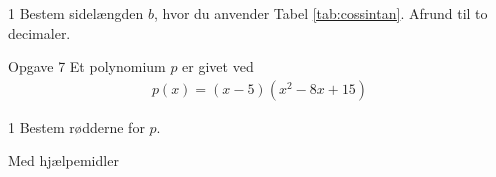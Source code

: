 \begin{delopgave}{1}
	Bestem sidelængden $b$, hvor du anvender Tabel \ref{tab:cossintan}. Afrund til to decimaler.
\end{delopgave}
%
%
%
%
%
\begin{opgavetekst}{Opgave 7}
	Et polynomium $p$ er givet ved
	\begin{align*}
		p(x) = (x-5)(x^2-8x+15)
	\end{align*}
\end{opgavetekst}
\begin{delopgave}{1}
	Bestem rødderne for $p$. 
\end{delopgave}
%
%
%
%
\newpage
\begin{center}
	\LARGE
	Med hjælpemidler
\end{center}

